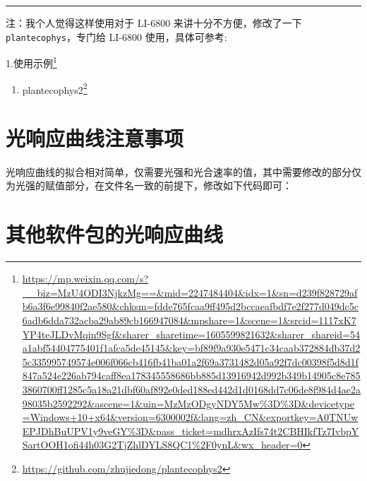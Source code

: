 \documentclass[
]{krantz}
\makeatletter
\newenvironment{Shaded}{\begin{snugshade}}{\end{snugshade}}
\newcommand{\NormalTok}[1]{#1}
\newcommand{\OtherTok}[1]{\textcolor[rgb]{0.56,0.35,0.01}{#1}}
\newcommand{\SpecialCharTok}[1]{\textcolor[rgb]{0.00,0.00,0.00}{#1}}
\providecommand{\tightlist}{%
  \setlength{\itemsep}{0pt}\setlength{\parskip}{0pt}}
\renewenvironment{quote}{\begin{VF}}{\end{VF}}
\renewcommand{\href}[2]{#2\footnote{\url{#1}}}
\newenvironment{kframe}{%
\medskip{}
\setlength{\fboxsep}{.8em}
 \def\at@end@of@kframe{}%
 \ifinner\ifhmode%
  \def\at@end@of@kframe{\end{minipage}}%
  \begin{minipage}{\columnwidth}%
 \fi\fi%
 \def\FrameCommand##1{\hskip\@totalleftmargin \hskip-\fboxsep
 \colorbox{shadecolor}{##1}\hskip-\fboxsep
     \hskip-\linewidth \hskip-\@totalleftmargin \hskip\columnwidth}%
 \MakeFramed {\advance\hsize-\width
   \@totalleftmargin\z@ \linewidth\hsize
   \@setminipage}}%
 {\par\unskip\endMakeFramed%
 \at@end@of@kframe}
\renewenvironment{Shaded}{\begin{kframe}}{\end{kframe}}
\makeatother
\begin{document}
\begin{center}\rule{0.5\linewidth}{0.5pt}\end{center}

\begin{quote}
注：我个人觉得这样使用对于 LI-6800 来讲十分不方便，修改了一下 \texttt{plantecophys}，专门给 LI-6800 使用，具体可参考:
\end{quote}

1.\href{https://mp.weixin.qq.com/s?__biz=MzU4ODI3NjkzMg==\&mid=2247484404\&idx=1\&sn=d239f828729afb6a3f6e99840f2ae580\&chksm=fdde765fcaa9ff495d2bccaeafbdf7e2f277d049dc5c6adb6dda732acba29ab89cb166947084\&mpshare=1\&scene=1\&srcid=1117xK7YP4teJLDvMqin9Sgf\&sharer_sharetime=1605599821632\&sharer_shareid=54a1abf54404775401f1afca5de45145\&key=bf89f9a930e5471c34caab372884db37d25c335995749574e006f066cb416fb41ba01a2f69a3731482d05a92f7dc00398f5d8d1f847a524e226ab794caff8ea178345558686bb885d13916942d992b349b14905c8e7853860700ff1285c5a18a21dbf60af892e0ded188ed442d1d0168dd7c06de8f984d4ae2a98035b2592292\&ascene=1\&uin=MzMzODgyNDY5Mw\%3D\%3D\&devicetype=Windows+10+x64\&version=6300002f\&lang=zh_CN\&exportkey=A0TNUwEPJDhBuUPV1y9veGY\%3D\&pass_ticket=mdhrxAzIfs74t2CBHIkfTz7IvbpYSartOOH1ofi44h03G2TjZhlDYLS8QC1\%2F0ynL\&wx_header=0}{使用示例}

\begin{enumerate}
\def\labelenumi{\arabic{enumi}.}
\setcounter{enumi}{1}
\tightlist
\item
  \href{https://github.com/zhujiedong/plantecophys2}{plantecophys2}
\end{enumerate}

\hypertarget{notice}{%
\section{光响应曲线注意事项}\label{notice}}

光响应曲线的拟合相对简单，仅需要光强和光合速率的值，其中需要修改的部分仅为光强的赋值部分，在文件名一致的前提下，修改如下代码即可：

\begin{Shaded}
\end{Shaded}

\hypertarget{other_light_response}{%
\section{其他软件包的光响应曲线}\label{other_light_response}}
\end{document}
